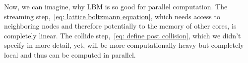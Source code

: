 Now, we can imagine, why LBM is so good for parallel computation.
The streaming step,~\eqref{eq: lattice boltzmann equation}, which needs access to neighboring nodes and therefore potentially to the memory of other cores, is completely linear.
The collide step,~\eqref{eq: define post collision}, which we didn't specify in more detail, yet, will be more computationally heavy but completely local and thus can be computed in parallel.
